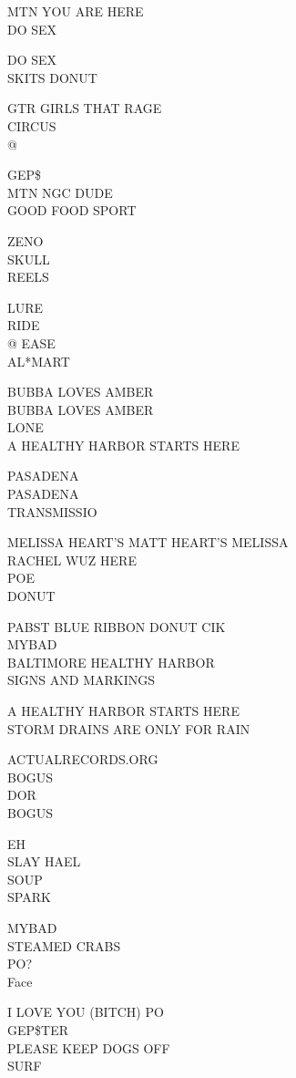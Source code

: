 \documentclass[10pt,letterpaper]{article}
\begin{document}
MTN YOU ARE HERE\\
DO SEX

DO SEX\\
SKITS DONUT

GTR GIRLS THAT RAGE\\
CIRCUS\\
@

GEP\$\\
MTN NGC DUDE\\
GOOD FOOD SPORT

ZENO\\
SKULL\\
REELS

LURE\\
RIDE\\
@ EASE\\
AL*MART

BUBBA LOVES AMBER\\
BUBBA LOVES AMBER\\
LONE\\
A HEALTHY HARBOR STARTS HERE

PASADENA\\
PASADENA\\
TRANSMISSIO

MELISSA HEART'S MATT HEART'S MELISSA\\
RACHEL WUZ HERE\\
POE\\
DONUT

PABST BLUE RIBBON DONUT CIK\\
MYBAD\\
BALTIMORE HEALTHY HARBOR\\
SIGNS AND MARKINGS

A HEALTHY HARBOR STARTS HERE\\
STORM DRAINS ARE ONLY FOR RAIN

ACTUALRECORDS.ORG\\
BOGUS\\
DOR\\
BOGUS

EH\\
SLAY HAEL\\
SOUP\\
SPARK

MYBAD\\
STEAMED CRABS\\
PO?\\
Face

I LOVE YOU (BITCH) PO\\
GEP\$TER\\
PLEASE KEEP DOGS OFF\\
SURF
\end{document}
